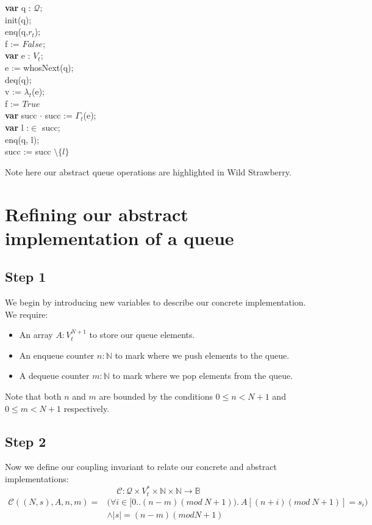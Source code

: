 \documentclass[a4paper]{scrartcl}
\newcommand{\N}{\mathbb{N}}
\newcommand{\C}{\mathcal{C}}
\newcommand{\Q}{\mathcal{Q}}
\newcommand{\ab}[1]{\textcolor{WildStrawberry}{#1}}
\begin{document}
{\begin{algorithm}[H]
\textbf{var} q : $\mathcal{Q};$ \\
\ab{init(q)}; \\
\ab{enq(q,$r_t$)}; \\
f := $False$; \\
\While {$\neg( f \lor \ab{isEmpty(q)})$} {
	\textbf{var} e : $V_t$; \\
	\ab{e := whosNext(q)}; \\
	\ab{deq(q)}; \\
	 {
		v := $\lambda_t$(e); \\
		f := $True$ \\
	} {
		\textbf{var} succ $\cdot$ succ := $\Gamma_t$(e); \\
		 {
			\textbf{var} l :$\in$ succ; \\
			\ab{enq(q, l)}; \\
			succ := succ $\setminus \{l\}$ \\
		}
	}
}
\end{algorithm}
%
Note here our \ab{abstract} queue operations are highlighted in \ab{Wild Strawberry}.
%
%
%
%
\section{Refining our abstract implementation of a queue}
%
\subsection{Step 1}
%
We begin by introducing new variables to describe our concrete implementation. We require: \\
%
\begin{itemize}
\item An array $A : V_t^{N+1}$ to store our queue elements.
\item An enqueue counter $n : \N$ to mark where we push elements to the queue.
\item A dequeue counter $m : \N$ to mark where we pop elements from the queue.
\end{itemize}
%
Note that both $n$ and $m$ are bounded by the conditions $0 \leq n < N + 1$ and $0 \leq m < N + 1$ respectively.
%
\subsection{Step 2}
%
Now we define our coupling invariant to relate our concrete and abstract implementations:
%
 \[ \C : \Q \times V_t^* \times \N \times \N \to \mathbb{B} \]
\begin{align*}
 \C((N, s), A, n, m) = &\Big( \forall i \in \Big[0..(n - m)(mod ~N + 1)\Big). ~A[(n + i)(mod ~N + 1)] = s_i\Big) \\
 &\land |s| = (n-m)(mod N + 1) 
\end{align*}
%
%
}
\end{document}
